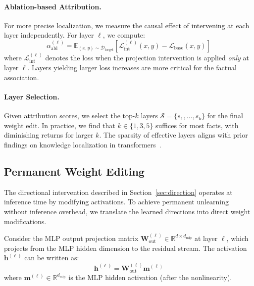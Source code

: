 \paragraph{Ablation-based Attribution.}
For more precise localization, we measure the causal effect of intervening at each layer independently. For layer $\ell$, we compute:
\begin{equation}
    \alpha^{(\ell)}_{\text{abl}} = \mathbb{E}_{(x,y) \sim \mathcal{D}_{\text{forget}}}\left[\mathcal{L}_{\text{int}}^{(\ell)}(x, y) - \mathcal{L}_{\text{base}}(x, y)\right]
    \label{eq:abl_attr}
\end{equation}
where $\mathcal{L}_{\text{int}}^{(\ell)}$ denotes the loss when the projection intervention is applied \emph{only} at layer $\ell$. Layers yielding larger loss increases are more critical for the factual association.

\paragraph{Layer Selection.}
Given attribution scores, we select the top-$k$ layers $\mathcal{S} = \{s_1, \ldots, s_k\}$ for the final weight edit. In practice, we find that $k \in \{1, 3, 5\}$ suffices for most facts, with diminishing returns for larger $k$. The sparsity of effective layers aligns with prior findings on knowledge localization in transformers~\citep{meng2022locating}.

\subsection{Permanent Weight Editing}
\label{sec:edit}

The directional intervention described in Section~\ref{sec:direction} operates at inference time by modifying activations. To achieve permanent unlearning without inference overhead, we translate the learned directions into direct weight modifications.

Consider the MLP output projection matrix $\mathbf{W}_{\text{out}}^{(\ell)} \in \mathbb{R}^{d \times d_{\text{mlp}}}$ at layer $\ell$, which projects from the MLP hidden dimension to the residual stream. The activation $\mathbf{h}^{(\ell)}$ can be written as:
\begin{equation}
    \mathbf{h}^{(\ell)} = \mathbf{W}_{\text{out}}^{(\ell)} \mathbf{m}^{(\ell)}
\end{equation}
where $\mathbf{m}^{(\ell)} \in \mathbb{R}^{d_{\text{mlp}}}$ is the MLP hidden activation (after the nonlinearity).

